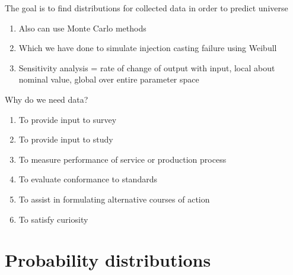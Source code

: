 \documentclass[aspectratio=1610,pdftex,dvipsnames,compress,xcolor={dvipsnames}]{beamer}
\begin{document}
\begin{frame}{The goal is to find distributions for collected data in order to predict universe}
    \begin{enumerate}[series=outerlist,topsep=0pt,itemsep=21pt,leftmargin=*,label=(\arabic*)]
        \item[]Also can use Monte Carlo methods  
        \item[]Which we have done to simulate injection casting failure using Weibull
        \item[]Sensitivity analysis = rate of change of output with input, local about nominal value, global over entire parameter space
    \end{enumerate}
\end{frame}


\begin{frame}{Why do we need data?}
    \begin{enumerate}[series=outerlist,topsep=0pt,itemsep=15pt,leftmargin=*,label=(\arabic*)]
        \item[]To provide input to survey 
        \item[]To provide input to study
        \item[]To measure performance of service or production process
        \item[]To evaluate conformance to standards
        \item[]To assist in formulating alternative courses of action
        \item[]To satisfy curiosity
    \end{enumerate}
\end{frame}


\section{Probability distributions}
\end{document}
